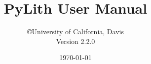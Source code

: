 \documentclass{pylithdoc}
\title{PyLith User Manual}
\author{\copyright University of California, Davis\\ Version 2.2.0}
\date{\today}
\begin{document}

\maketitle

\frontmatter
\tableofcontents{}
\listoffigures
\listoftables


\mainmatter\raggedbottom












\appendix






\end{document}
